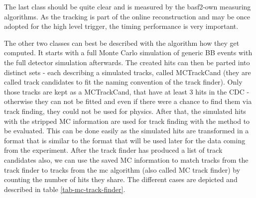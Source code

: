 The last class should be quite clear and is measured by the basf2-own measuring algorithms. As the tracking is part of the online reconstruction and may be once adopted for the high level trigger, the timing performance is very important. 

The other two classes can best be described with the algorithm how they get computed. It starts with a full Monte Carlo simulation of generic BB events with the full detector simulation afterwards. The created hits can then be parted into distinct sets - each describing a simulated tracks, called MCTrackCand (they are called track candidates to fit the naming convention of the track finder). Only those tracks are kept as a MCTrackCand, that have at least 3 hits in the CDC - otherwise they can not be fitted and even if there were a chance to find them via track finding, they could not be used for physics. After that, the simulated hits with the stripped MC information are used for track finding with the method to be evaluated. This can be done easily as the simulated hits are transformed in a format that is similar to the format that will be used later for the data coming from the experiment. After the track finder has produced a list of track candidates also, we can use the saved MC information to match tracks from the track finder to tracks from the mc algorithm (also called MC track finder) by counting the number of hits they share. The different cases are depicted and described in table \ref{tab-mc-track-finder}.

